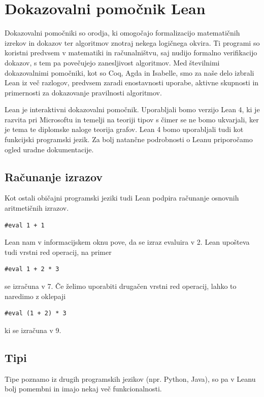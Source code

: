 \documentclass[mat1]{fmfdelo}
\begin{document}
\section{Dokazovalni pomočnik Lean}
Dokazovalni pomočniki so orodja, ki omogočajo formalizacijo matematičnih izrekov in dokazov ter algoritmov znotraj nekega logičnega okvira. 
Ti programi so koristni predvsem v matematiki in računalništvu, saj nudijo formalno verifikacijo dokazov, s tem pa 
povečujejo zanesljivost algoritmov.
Med številnimi dokazovalnimi pomočniki, kot so Coq, Agda in Isabelle, smo za naše delo izbrali Lean iz več razlogov, predvsem
zaradi enostavnosti uporabe, aktivne skupnosti in primernosti za dokazovanje pravilnosti algoritmov. 

Lean je interaktivni dokazovalni pomočnik. Uporabljali bomo verzijo Lean 4, ki je razvita pri Microsoftu in temelji na teoriji tipov
s čimer se ne bomo ukvarjali, ker je tema te diplomske naloge teorija grafov. Lean 4 bomo uporabljali tudi
kot funkcijski programski jezik. Za bolj natančne podrobnosti o Leanu priporočamo ogled uradne dokumentacije. 


\subsection{Računanje izrazov}
Kot ostali običajni programski jeziki tudi Lean podpira računanje osnovnih aritmetičnih izrazov.
\begin{lstlisting}
#eval 1 + 1
\end{lstlisting}
Lean nam v informacijskem oknu pove, da se izraz evaluira v 2. Lean upošteva tudi vrstni red operacij, na primer
\begin{lstlisting}
#eval 1 + 2 * 3
\end{lstlisting}
se izračuna v 7. Če želimo uporabiti drugačen vrstni red operacij, lahko to naredimo z oklepaji
\begin{lstlisting}
#eval (1 + 2) * 3
\end{lstlisting}
ki se izračuna v 9.


\subsection{Tipi}
Tipe poznamo iz drugih programskih jezikov (npr. Python, Java), so pa v Leanu bolj pomembni in imajo nekaj več funkcionalnosti.
\end{document}
